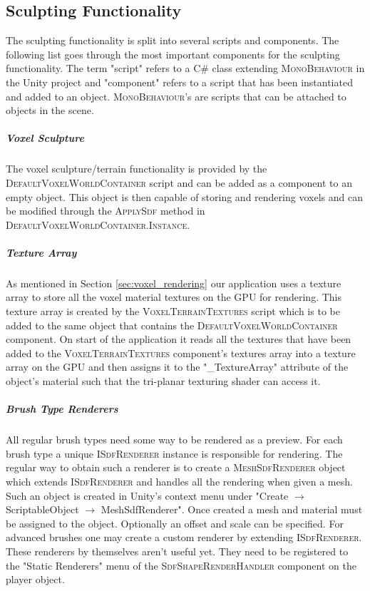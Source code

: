 \subsection{Sculpting Functionality}

The sculpting functionality is split into several scripts and components. The following list goes through the most important components for the sculpting functionality. The term "script" refers to a C\# class extending \textsc{MonoBehaviour} in the Unity project and "component" refers to a script that has been instantiated and added to an object. \textsc{MonoBehaviour}'s are scripts that can be attached to objects in the scene.

\subparagraph{Voxel Sculpture}
The voxel sculpture/terrain functionality is provided by the \textsc{DefaultVoxelWorldContainer} script and can be added as a component to an empty object. This object is then capable of storing and rendering voxels and can be modified through the \textsc{ApplySdf} method in \textsc{DefaultVoxelWorldContainer.Instance}.

\subparagraph{Texture Array}
As mentioned in Section \ref{sec:voxel_rendering} our application uses a texture array to store all the voxel material textures on the GPU for rendering. This texture array is created by the \textsc{VoxelTerrainTextures} script which is to be added to the same object that contains the \textsc{DefaultVoxelWorldContainer} component. On start of the application it reads all the textures that have been added to the \textsc{VoxelTerrainTextures} component's textures array into a texture array on the GPU and then assigns it to the "\_TextureArray" attribute of the object's material such that the tri-planar texturing shader can access it.

\subparagraph{Brush Type Renderers}
All regular brush types need some way to be rendered as a preview. For each brush type a unique \textsc{ISdfRenderer} instance is responsible for rendering. The regular way to obtain such a renderer is to create a \textsc{MeshSdfRenderer} object which extends \textsc{ISdfRenderer} and handles all the rendering when given a mesh. Such an object is created in Unity's context menu under "Create $\rightarrow$ ScriptableObject $\rightarrow$ MeshSdfRenderer". Once created a mesh and material must be assigned to the object. Optionally an offset and scale can be specified. For advanced brushes one may create a custom renderer by extending \textsc{ISdfRenderer}.\\
These renderers by themselves aren't useful yet. They need to be registered to the "Static Renderers" menu of the \textsc{SdfShapeRenderHandler} component on the player object.

